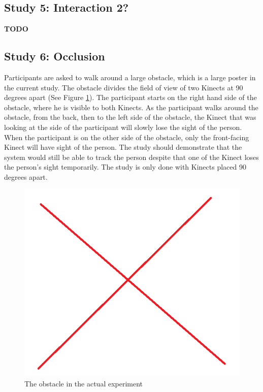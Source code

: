 \documentclass{sigchi}
\begin{document}
\subsection{Study 5: Interaction 2?}

\textbf{TODO}

\subsection{Study 6: Occlusion}

Participants are asked to walk around a large obstacle, which is a large poster in the current study. The obstacle divides the field of view of two Kinects at 90 degrees apart (See Figure \ref{fig:studies_obstacle}). The participant starts on the right hand side of the obstacle, where he is visible to both Kinects. As the participant walks around the obstacle, from the back, then to the left side of the obstacle, the Kinect that was looking at the side of the participant will slowly lose the sight of the person. When the participant is on the other side of the obstacle, only the front-facing Kinect will have sight of the person. The study should demonstrate that the system would still be able to track the person despite that one of the Kinect loses the person's sight temporarily. The study is only done with Kinects placed 90 degrees apart.

\begin{figure}[!h]
  \centering
  \includegraphics[width=0.9\columnwidth]{studies_obstacle}
  \caption{The obstacle in the actual experiment}
  \label{fig:studies_obstacle}
\end{figure}
\end{document}
